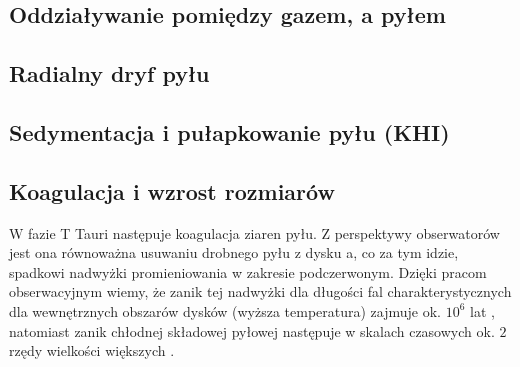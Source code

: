 \subsection{Oddziaływanie pomiędzy gazem, a pyłem}

\subsection{Radialny dryf pyłu}

\subsection{Sedymentacja i pułapkowanie pyłu (KHI)}

\subsection{Koagulacja i wzrost rozmiarów}


W fazie T Tauri następuje koagulacja ziaren pyłu. Z perspektywy obserwatorów
jest ona równoważna usuwaniu drobnego pyłu z dysku a, co za tym idzie, spadkowi
nadwyżki promieniowania w zakresie podczerwonym. Dzięki pracom obserwacyjnym
wiemy, że zanik tej nadwyżki dla długości fal charakterystycznych dla
wewnętrznych obszarów dysków (wyższa temperatura) zajmuje ok. $10^6$ lat
\cite{hillenbrand}, natomiast zanik chłodnej składowej pyłowej następuje w
skalach czasowych ok. $2$ rzędy wielkości większych \cite{carpenter}.


